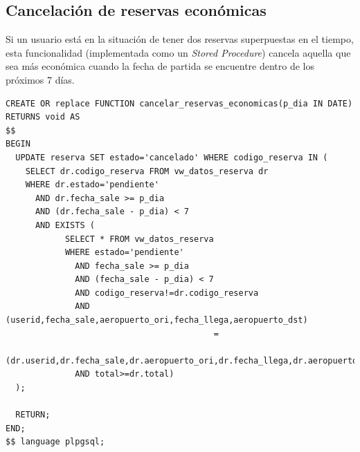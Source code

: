 \documentclass[a4paper,10pt]{article}
\begin{document}
\subsection{Cancelación de reservas económicas}

Si un usuario está en la situación de tener dos reservas superpuestas en el tiempo, esta funcionalidad (implementada como un \textit{Stored Procedure}) cancela aquella que sea más económica
cuando la fecha de partida se encuentre dentro de los próximos 7 días.

\begin{verbatim}
CREATE OR replace FUNCTION cancelar_reservas_economicas(p_dia IN DATE) RETURNS void AS 
$$
BEGIN
  UPDATE reserva SET estado='cancelado' WHERE codigo_reserva IN (
    SELECT dr.codigo_reserva FROM vw_datos_reserva dr
    WHERE dr.estado='pendiente'
      AND dr.fecha_sale >= p_dia
      AND (dr.fecha_sale - p_dia) < 7
      AND EXISTS (
            SELECT * FROM vw_datos_reserva 
            WHERE estado='pendiente'
              AND fecha_sale >= p_dia
              AND (fecha_sale - p_dia) < 7
              AND codigo_reserva!=dr.codigo_reserva
              AND (userid,fecha_sale,aeropuerto_ori,fecha_llega,aeropuerto_dst)
                                          =
                  (dr.userid,dr.fecha_sale,dr.aeropuerto_ori,dr.fecha_llega,dr.aeropuerto_dst)
              AND total>=dr.total)
  );

  RETURN;
END;
$$ language plpgsql;

\end{verbatim}

\newpage
% 
\end{document}
